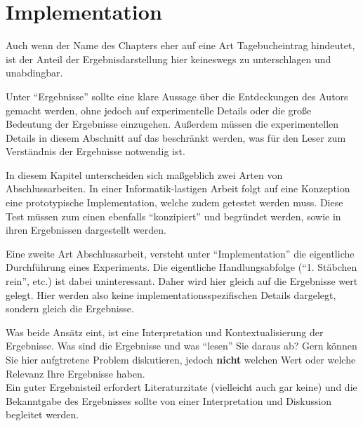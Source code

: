 

\clearpage

\chapter{Implementation}

\iffalse
Auch wenn der Name des Chapters eher auf eine Art Tagebucheintrag hindeutet, ist der Anteil der Ergebnisdarstellung hier keineswegs zu unterschlagen und unabdingbar.

Unter \enquote{Ergebnisse} sollte eine klare Aussage über die Entdeckungen des Autors gemacht werden, ohne jedoch auf experimentelle Details oder die große Bedeutung der Ergebnisse einzugehen. 
Außerdem müssen die experimentellen Details in diesem Abschnitt auf das beschränkt werden, was für den Leser zum Verständnis der Ergebnisse notwendig ist.

In diesem Kapitel unterscheiden sich maßgeblich zwei Arten von Abschlussarbeiten. In einer Informatik-lastigen Arbeit folgt auf eine Konzeption eine prototypische Implementation,
welche zudem getestet werden muss. Diese Test müssen zum einen ebenfalls \enquote{konzipiert} und begründet werden, sowie in ihren Ergebnissen dargestellt werden.

Eine zweite Art Abschlussarbeit, versteht unter \enquote{Implementation} die eigentliche Durchführung eines Experiments. Die eigentliche Handlungsabfolge (\enquote{1. Stäbchen rein}, etc.) ist dabei 
uninteressant. Daher wird hier gleich auf die Ergebnisse wert gelegt. Hier werden also keine implementationsspezifischen Details dargelegt, sondern gleich die Ergebnisse.

Was beide Ansätz eint, ist eine Interpretation und Kontextualisierung der Ergebnisse. Was sind die Ergebnisse und was \enquote{lesen} Sie daraus ab?
Gern können Sie hier aufgtretene Problem diskutieren, jedoch \textbf{nicht} welchen Wert oder welche Relevanz Ihre Ergebnisse haben.\\

Ein guter Ergebnisteil erfordert Literaturzitate (vielleicht auch gar keine) und die Bekanntgabe des Ergebnisses sollte von einer Interpretation und Diskussion begleitet werden. 

